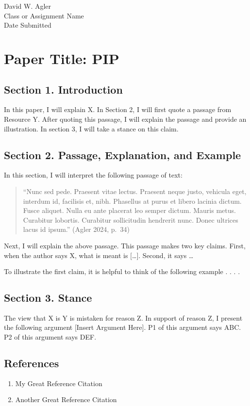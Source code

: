 David W. Agler\\
Class or Assignment Name\\
Date Submitted

\section{Paper Title: PIP}\label{paper-title-pip}

\subsection{Section 1. Introduction}\label{section-1.-introduction}

In this paper, I will explain X. In Section 2, I will first quote a
passage from Resource Y. After quoting this passage, I will explain the
passage and provide an illustration. In section 3, I will take a stance
on this claim.

\subsection{Section 2. Passage, Explanation, and
Example}\label{section-2.-passage-explanation-and-example}

In this section, I will interpret the following passage of text:

\begin{quote}
``Nunc sed pede. Praesent vitae lectus. Praesent neque justo, vehicula
eget, interdum id, facilisis et, nibh. Phasellus at purus et libero
lacinia dictum. Fusce aliquet. Nulla eu ante placerat leo semper dictum.
Mauris metus. Curabitur lobortis. Curabitur sollicitudin hendrerit nunc.
Donec ultrices lacus id ipsum.'' (Agler 2024, p.~34)
\end{quote}

Next, I will explain the above passage. This passage makes two key
claims. First, when the author says X, what is meant is {[}\ldots{]}.
Second, it says \ldots{}

To illustrate the first claim, it is helpful to think of the following
example . . . .

\subsection{Section 3. Stance}\label{section-3.-stance}

The view that X is Y is mistaken for reason Z. In support of reason Z, I
present the following argument {[}Insert Argument Here{]}. P1 of this
argument says ABC. P2 of this argument says DEF.

\subsection{References}\label{references}

\begin{enumerate}
\def\labelenumi{\arabic{enumi}.}
\tightlist
\item
  My Great Reference Citation
\item
  Another Great Reference Citation
\end{enumerate}
